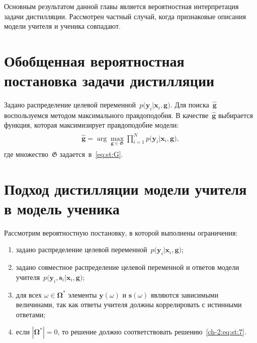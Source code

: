 Основным результатом данной главы является вероятностная интерпретация задачи дистилляции. Рассмотрен частный случай, когда признаковые описания модели учителя и ученика совпадают.

\section{Обобщенная вероятностная постановка задачи дистилляции}
Задано распределение целевой переменной~$p\bigr(\mathbf{y}_i|\mathbf{x}_i, \mathbf{g}\bigr)$.
Для поиска~$\hat{\mathbf{g}}$ воспользуемся методом максимального правдоподобия. В качестве~$\hat{\mathbf{g}}$ выбирается функция, которая максимизирует правдоподобие модели:
\begin{gather}
\label{ch-2:eq:st:7}
\begin{aligned}
\hat{\mathbf{g}} = \arg\max_{\mathbf{g}\in \mathfrak{G}} \prod_{i=1}^{N}p\bigr(\mathbf{y}_{i}|\mathbf{x}_i, \mathbf{g}\bigr),
\end{aligned}
\end{gather}
где множество~$\mathfrak{G}$ задается~в~\eqref{eq:st:G}.
\section{Подход дистилляции модели учителя в модель ученика}
Рассмотрим вероятностную постановку, в которой выполнены ограничения:
\begin{enumerate}[1)]
	\item задано распределение целевой переменной~$p\bigr(\mathbf{y}_i|\mathbf{x}_i, \mathbf{g}\bigr)$;
	\item задано совместное распределение целевой переменной и ответов модели учителя~$p\bigr(\mathbf{y}_i, \mathbf{s}_i|\mathbf{x}_i, \mathbf{g}\bigr)$;
	\item для всех $\omega \in \bm{\Omega}^*$ элементы $\mathbf{y}(\omega)$ и $\mathbf{s}(\omega)$ являются зависимыми величинами, так как ответы учителя должны коррелировать с истинными ответами;
	\item если $|\bm{\Omega}^*|=0$, то решение должно соответствовать решению~\eqref{ch-2:eq:st:7}.
\end{enumerate}

